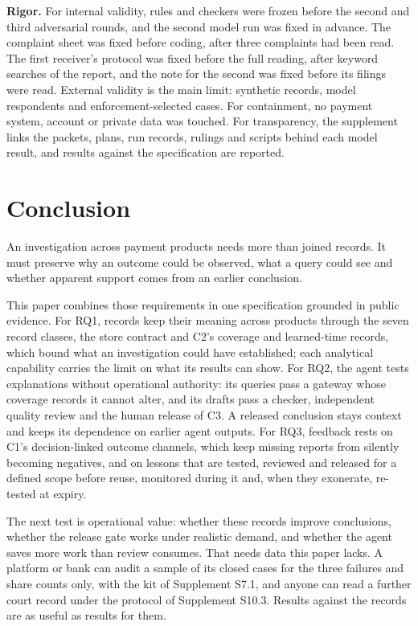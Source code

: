 \documentclass[acmlarge,nonacm]{acmart}
\begin{document}
\textbf{Rigor.} For internal validity, rules and checkers were frozen
before the second and third adversarial rounds, and the second model run
was fixed in advance. The complaint sheet was fixed before coding, after
three complaints had been read. The first receiver's protocol was fixed
before the full reading, after keyword searches of the report, and the
note for the second was fixed before its filings were read. External
validity is the main limit: synthetic records, model respondents and
enforcement-selected cases. For containment, no payment system, account
or private data was touched. For transparency, the supplement links the
packets, plans, run records, rulings and scripts behind each model
result, and results against the specification are reported.

\hypertarget{conclusion}{%
\section{Conclusion}\label{conclusion}}

An investigation across payment products needs more than joined records.
It must preserve why an outcome could be observed, what a query could
see and whether apparent support comes from an earlier conclusion.

This paper combines those requirements in one specification grounded in
public evidence. For RQ1, records keep their meaning across products
through the seven record classes, the store contract and C2's coverage
and learned-time records, which bound what an investigation could have
established; each analytical capability carries the limit on what its
results can show. For RQ2, the agent tests explanations without
operational authority: its queries pass a gateway whose coverage records
it cannot alter, and its drafts pass a checker, independent quality
review and the human release of C3. A released conclusion stays context
and keeps its dependence on earlier agent outputs. For RQ3, feedback
rests on C1's decision-linked outcome channels, which keep missing
reports from silently becoming negatives, and on lessons that are
tested, reviewed and released for a defined scope before reuse,
monitored during it and, when they exonerate, re-tested at expiry.

The next test is operational value: whether these records improve
conclusions, whether the release gate works under realistic demand, and
whether the agent saves more work than review consumes. That needs data
this paper lacks. A platform or bank can audit a sample of its closed
cases for the three failures and share counts only, with the kit of
Supplement S7.1, and anyone can read a further court record under the
protocol of Supplement S10.3. Results against the records are as useful
as results for them.
\end{document}
